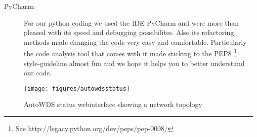 \begin{description}
    \item [PyCharm:]
      For our python coding we used the \ac{IDE} PyCharm \cite{pycharm} and were more than pleased with its speed and debugging possibilites.
      Also its refactoring methods made changing the code very easy and comfortable. Particularly the code analysis tool that comes with it made sticking to the
      \ac{PEP8} \footnote{See http://legacy.python.org/dev/peps/pep-0008/} style-guideline almost fun and we hope it helps you to better understand our code.
      
    \end{description}

    \begin{figure}[h]
      \centering
      \texttt{[image: figures/autowdsstatus]}
      \caption{AutoWDS status webinterface showing a network topology}
      \label{fig:autowdsstatus}
    \end{figure}
    
\clearpage

  
